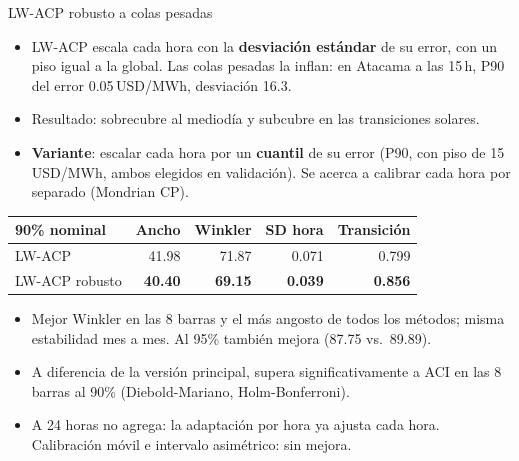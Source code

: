 \documentclass[aspectratio=169]{beamer}
\begin{document}
\begin{frame}{LW-ACP robusto a colas pesadas}
    \footnotesize
    \begin{itemize}
        \item LW-ACP escala cada hora con la \textbf{desviación estándar} de su error, con un piso igual a la global. Las colas pesadas la inflan: en Atacama a las 15\,h, P90 del error 0.05\,USD/MWh, desviación 16.3.
        \item Resultado: sobrecubre al mediodía y subcubre en las transiciones solares.
        \item \textbf{Variante}: escalar cada hora por un \textbf{cuantil} de su error (P90, con piso de 15\,USD/MWh, ambos elegidos en validación). Se acerca a calibrar cada hora por separado (Mondrian CP).
    \end{itemize}
    \begin{table}
        \centering
        \begin{tabular}{lrrrr}
            \toprule
            90\% nominal & \textbf{Ancho} & \textbf{Winkler} & \textbf{SD hora} & \textbf{Transición} \\
            \midrule
            LW-ACP          & 41.98 & 71.87 & 0.071 & 0.799 \\
            LW-ACP robusto  & \textbf{40.40} & \textbf{69.15} & \textbf{0.039} & \textbf{0.856} \\
            \bottomrule
        \end{tabular}
    \end{table}
    \begin{itemize}
        \item Mejor Winkler en las 8 barras y el más angosto de todos los métodos; misma estabilidad mes a mes. Al 95\% también mejora (87.75 vs.\ 89.89).
        \item A diferencia de la versión principal, supera significativamente a ACI en las 8 barras al 90\% (Diebold-Mariano, Holm-Bonferroni).
        \item A 24 horas no agrega: la adaptación por hora ya ajusta cada hora. Calibración móvil e intervalo asimétrico: sin mejora.
    \end{itemize}
\end{frame}
\end{document}
